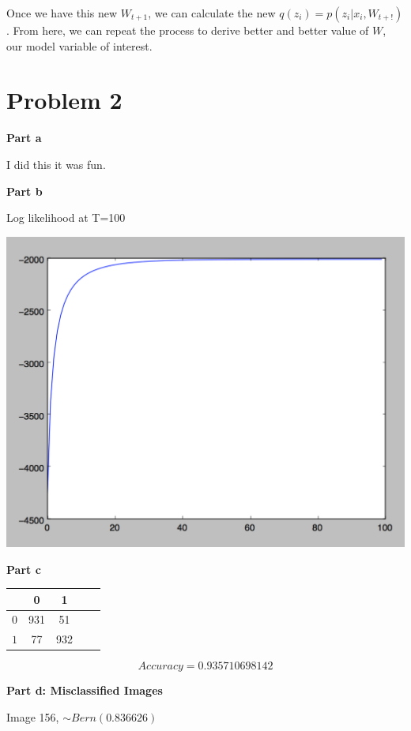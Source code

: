 \documentclass[twoside,11pt]{homework}
\begin{document}
Once we have this new $W_{t+1}$, we can calculate the new $q(z_i) = p(z_i | x_i, W_{t+!})$.
From here, we can repeat the process to derive better and better value of $W$, our model variable of interest.

\section*{Problem 2}

\textbf{Part a}

I did this it was fun.

\textbf{Part b}

Log likelihood at T=100

\includegraphics[scale=.5]{images/loglikelihood.png}

\textbf{Part c}

\begin{center}
  \begin{tabular}{c||c|c|c|c}
    & 0
    & 1 \\
    \hline
    \hline
    $0$
    & 931
    & 51
    \\
    \hline
    $1$
    & 77
    & 932
  \end{tabular}
\end{center}

\[
Accuracy = 0.935710698142
\]

\textbf{Part d: Misclassified Images}

Image 156, $\sim Bern(0.836626)$
\end{document}
